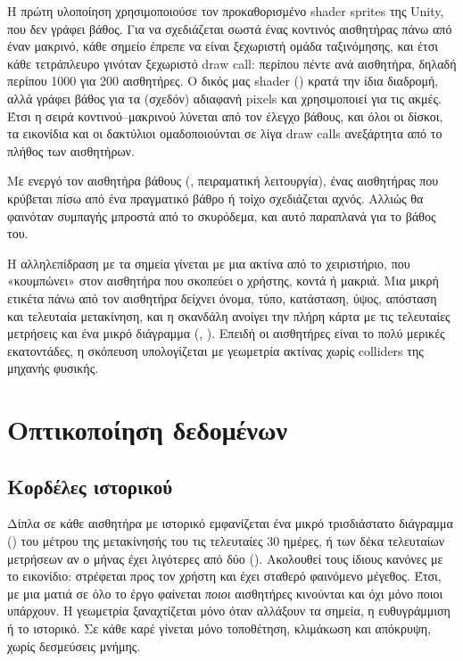 Η πρώτη υλοποίηση χρησιμοποιούσε τον προκαθορισμένο shader sprites της Unity, που δεν γράφει βάθος. Για να σχεδιάζεται σωστά ένας κοντινός αισθητήρας πάνω από έναν μακρινό, κάθε σημείο έπρεπε να είναι ξεχωριστή ομάδα ταξινόμησης, και έτσι κάθε τετράπλευρο γινόταν ξεχωριστό draw call: περίπου πέντε ανά αισθητήρα, δηλαδή περίπου 1000 για 200 αισθητήρες. Ο δικός μας shader () κρατά την ίδια διαδρομή, αλλά γράφει βάθος για τα (σχεδόν) αδιαφανή pixels και χρησιμοποιεί  για τις ακμές. Έτσι η σειρά κοντινού--μακρινού λύνεται από τον έλεγχο βάθους, και όλοι οι δίσκοι, τα εικονίδια και οι δακτύλιοι ομαδοποιούνται σε λίγα draw calls ανεξάρτητα από το πλήθος των αισθητήρων.

Με ενεργό τον αισθητήρα βάθους (, πειραματική λειτουργία), ένας αισθητήρας που κρύβεται πίσω από ένα πραγματικό βάθρο ή τοίχο σχεδιάζεται αχνός. Αλλιώς θα φαινόταν συμπαγής μπροστά από το σκυρόδεμα, και αυτό παραπλανά για το βάθος του.

Η αλληλεπίδραση με τα σημεία γίνεται με μια ακτίνα από το χειριστήριο, που «κουμπώνει» στον αισθητήρα που σκοπεύει ο χρήστης, κοντά ή μακριά. Μια μικρή ετικέτα πάνω από τον αισθητήρα δείχνει όνομα, τύπο, κατάσταση, ύψος, απόσταση και τελευταία μετακίνηση, και η σκανδάλη ανοίγει την πλήρη κάρτα με τις τελευταίες μετρήσεις και ένα μικρό διάγραμμα (, ). Επειδή οι αισθητήρες είναι το πολύ μερικές εκατοντάδες, η σκόπευση υπολογίζεται με γεωμετρία ακτίνας χωρίς colliders της μηχανής φυσικής.

\section{Οπτικοποίηση δεδομένων}
\label{sec:impl-vis}

\subsection{Κορδέλες ιστορικού}
Δίπλα σε κάθε αισθητήρα με ιστορικό εμφανίζεται ένα μικρό τρισδιάστατο διάγραμμα () του μέτρου της μετακίνησής του τις τελευταίες 30 ημέρες, ή των δέκα τελευταίων μετρήσεων αν ο μήνας έχει λιγότερες από δύο (). Ακολουθεί τους ίδιους κανόνες με το εικονίδιο: στρέφεται προς τον χρήστη και έχει σταθερό φαινόμενο μέγεθος. Έτσι, με μια ματιά σε όλο το έργο φαίνεται \emph{ποιοι} αισθητήρες κινούνται και όχι μόνο ποιοι υπάρχουν. Η γεωμετρία ξαναχτίζεται μόνο όταν αλλάξουν τα σημεία, η ευθυγράμμιση ή το ιστορικό. Σε κάθε καρέ γίνεται μόνο τοποθέτηση, κλιμάκωση και απόκρυψη, χωρίς δεσμεύσεις μνήμης.

